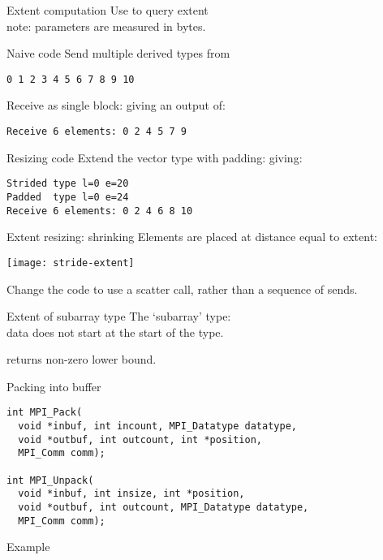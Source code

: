 \begin{numberedframe}{Extent computation}
  Use  to query extent\\
  note: parameters are measured in bytes.

\end{numberedframe}

\begin{numberedframe}{Naive code}
  Send multiple derived types
  from
\begin{verbatim}
0 1 2 3 4 5 6 7 8 9 10
\end{verbatim}

  Receive as single block:
giving an output of:
\begin{verbatim}
Receive 6 elements: 0 2 4 5 7 9
\end{verbatim}
\end{numberedframe}

\begin{numberedframe}{Resizing code}
  Extend the vector type with padding:
giving:
\begin{verbatim}
Strided type l=0 e=20
Padded  type l=0 e=24
Receive 6 elements: 0 2 4 6 8 10
\end{verbatim}
\end{numberedframe}

\begin{numberedframe}{Extent resizing: shrinking}
  Elements are placed at distance equal to extent:

  \texttt{[image: stride-extent]}
\end{numberedframe}

\begin{exerciseframe}[stridescatter]
  Change the  code to use a scatter call,
  rather than a sequence of sends.
\end{exerciseframe}

\begin{numberedframe}{Extent of subarray type}
  The `subarray' type: \\
  data does not start at the start of the type.

   returns
  non-zero lower bound.
\end{numberedframe}


\begin{numberedframe}{Packing into buffer}
\lstset{language=C}
\begin{lstlisting}
int MPI_Pack(
  void *inbuf, int incount, MPI_Datatype datatype,
  void *outbuf, int outcount, int *position,
  MPI_Comm comm);

int MPI_Unpack(
  void *inbuf, int insize, int *position,
  void *outbuf, int outcount, MPI_Datatype datatype,
  MPI_Comm comm);
\end{lstlisting}
\end{numberedframe}

\begin{numberedframe}{Example}
\small
{}
\end{numberedframe}

